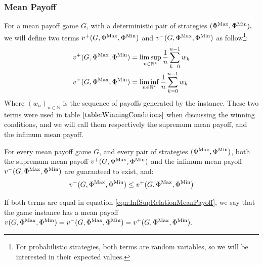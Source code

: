 \subsubsection{Mean Payoff}
For a mean payoff game $G$, with a deterministic pair of strategies $(\Phi^{\operatorname{Max}},\Phi^{\operatorname{Min}}),$ we will define two terms $v^+(G,\Phi^{\operatorname{Max}},\Phi^{\operatorname{Min}})$ and $v^-(G,\Phi^{\operatorname{Max}},\Phi^{\operatorname{Min}})$ as follow\footnote{For probabilistic strategies, both terms are random variables, so we will be interested in their expected values.}:
\begin{align*}
v^+(G,\Phi^{\operatorname{Max}},\Phi^{\operatorname{Min}}) &=\limsup_{n\in\mathbb{N}^*} \frac{1}{n}\sum_{k=0}^{n-1} w_k \\
v^-(G,\Phi^{\operatorname{Max}},\Phi^{\operatorname{Min}}) &=\liminf_{n\in\mathbb{N}^*} \frac{1}{n}\sum_{k=0}^{n-1} w_k
\end{align*} 
Where $(w_n)_{n\in\mathbb{N}}$ is the sequence of payoffs generated by the instance.
\newline These two terms were used in table $\ref{table:WinningConditions}$ when discussing the winning conditions, and we will call them respectively the supremum mean payoff, and the infimum mean payoff. 
\begin{theorem}
	For every mean payoff game $G$, and every pair of strategies $(\Phi^{\operatorname{Max}},\Phi^{\operatorname{Min}})$, both the supremum mean payoff $v^+(G,\Phi^{\operatorname{Max}},\Phi^{\operatorname{Min}})$ and the infimum mean payoff $v^-(G,\Phi^{\operatorname{Max}},\Phi^{\operatorname{Min}})$ are guaranteed to exist, and:
	\begin{equation}
		\label{eqn:InfSupRelationMeanPayoff}
		v^-(G,\Phi^{\operatorname{Max}},\Phi^{\operatorname{Min}}) \le v^+(G,\Phi^{\operatorname{Max}},\Phi^{\operatorname{Min}})
	\end{equation}
\end{theorem}
If both terms are equal in equation  \eqref{eqn:InfSupRelationMeanPayoff}, we say that the game instance has a mean payoff $v(G,\Phi^{\operatorname{Max}},\Phi^{\operatorname{Min}})=v^-(G,\Phi^{\operatorname{Max}},\Phi^{\operatorname{Min}})=v^+(G,\Phi^{\operatorname{Max}},\Phi^{\operatorname{Min}}).$

